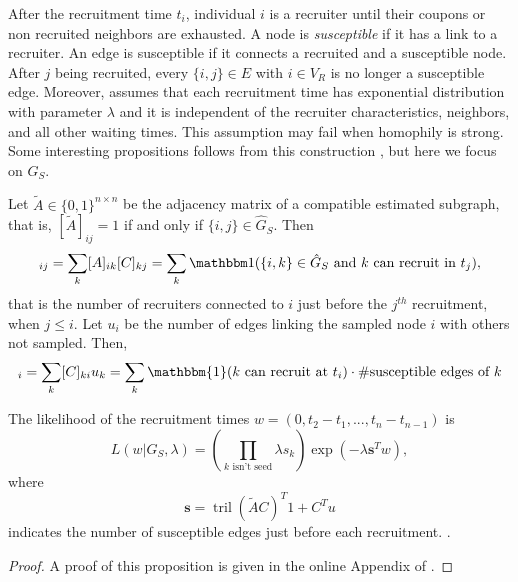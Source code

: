 After the recruitment time $t_i$, individual $i$ is a recruiter until 
their coupons or non recruited neighbors are exhausted. 
A node is {\em susceptible} if it has a link to a recruiter. An edge is
susceptible if it connects a recruited and a susceptible node. After $j$ being
recruited, every $\{i,j\} \in E$ with $i \in V_R$ is no longer a susceptible
edge. Moreover, \textcite[p. 194]{crawford2016} assumes that each recruitment time
has exponential distribution with parameter $\lambda$ and it is independent of
the recruiter characteristics, neighbors, and all other waiting times. This assumption may
fail when homophily is strong. Some interesting propositions follows from this
construction \cite[p. 195]{crawford2016}, but here we focus on $G_S$. 

Let $\tilde{A} \in \{0,1\}^{n \times n}$ be the adjacency matrix of a  
compatible estimated subgraph, that is, $[\tilde{A}]_{ij} = 1$ if and only 
if $\{i,j\} \in \hat{G}_S$.
Then 
\begin{equation*}
  [AC]_{ij} = \sum_{k} [A]_{ik}[C]_{kj} = \sum_{k} \ind(\{i,k\} \in \hat{G}_S \text{ and } k \text{ can recruit in } t_j),  
\end{equation*}
that is the number of recruiters connected to $i$ just before the $j^{th}$
recruitment, when $j \le i$. Let $u_i$ be the number of edges linking the
sampled node $i$ with others not sampled. Then,
\begin{equation*}
  [C^T u]_{i} = \sum_{k} [C]_{ki} u_k  = \sum_k \mathbbm{1}(k \text{ can recruit at } t_i)\cdot \#\text{susceptible edges of }k 
\end{equation*}

\begin{proposition}
  The likelihood of the recruitment times $w = (0, t_2 - t_1, ..., t_n -
  t_{n-1})$ is 
  \begin{equation}
    \label{eq:likelihood-wainting-times}
    L(w| G_S, \lambda) = \left(\prod_{k \text{ isn't seed}} \lambda s_k\right) \exp(-\lambda \boldsymbol{s}^Tw), 
  \end{equation}
  where 
  \begin{equation*}
    \boldsymbol{s} = \operatorname{tril}(\tilde{A}C)^T 1 + C^Tu 
  \end{equation*}
  indicates the number of susceptible edges just before each recruitment.
  \cite[p. 197]{crawford2016}.
\end{proposition}

\begin{proof}
  A proof of this proposition is given in the online Appendix of
  \cite{crawford2016}. 
\end{proof}

